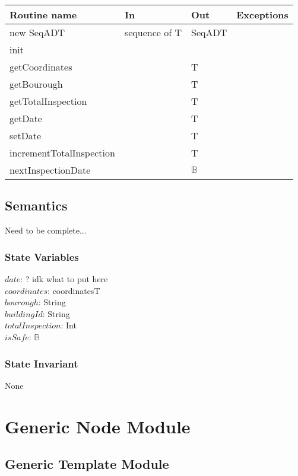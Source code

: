 \documentclass[12pt]{article}
\begin{document}
\begin{tabular}{| l | l | l | p{5cm} |}
\hline
\textbf{Routine name} & \textbf{In} & \textbf{Out} & \textbf{Exceptions}\\
\hline
new SeqADT & sequence of T & SeqADT & ~\\
\hline
init & ~ & ~ & ~\\
\hline
getCoordinates & ~ & T & ~\\
\hline
getBourough & ~ & T & ~\\
\hline
getTotalInspection & ~ & T & ~\\
\hline
getDate & ~ & T & ~\\
\hline
setDate & ~ & T & ~\\
\hline
incrementTotalInspection & ~ & T & ~\\
\hline
nextInspectionDate & ~ & $\mathbb{B}$ & ~\\
\hline
\end{tabular}

\subsection* {Semantics}

Need to be complete...

\subsubsection* {State Variables}

$date$: ? idk what to put here\\
$coordinates$:  coordinatesT\\
$bourough$: String\\
$buildingId$:  String\\
$totalInspection$: Int\\
$isSafe$:  $\mathbb{B}$\\

\subsubsection* {State Invariant}

None

\newpage

\section* {Generic Node Module}

\subsection*{Generic Template Module}
\end{document}
